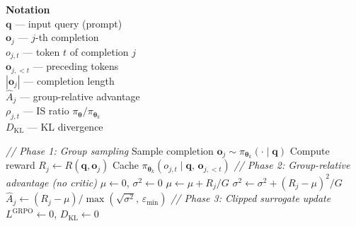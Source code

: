 \documentclass[11pt]{article}
\begin{document}
\begin{algorithm}[p]
\begin{minipage}[t]{0.28\linewidth}
\vspace{6pt}
\textbf{Notation} \\[2pt]
$\mathbf{q}$ — input query (prompt) \\
$\mathbf{o}_j$ — $j$-th completion \\
$o_{j,t}$ — token $t$ of completion $j$ \\
$\mathbf{o}_{j,<t}$ — preceding tokens \\
$|\mathbf{o}_j|$ — completion length \\
$\hat{A}_j$ — group-relative advantage \\
$\rho_{j,t}$ — IS ratio $\pi_{\boldsymbol{\theta}} / \pi_{\boldsymbol{\theta}_k}$ \\
$D_{\text{KL}}$ — KL divergence
\end{minipage}%
\hfill
\vrule
\hfill
\begin{minipage}[t]{0.68\linewidth}
\begin{algorithmic}[1]
    \Statex \hspace{\algorithmicindent}\textit{// Phase 1: Group sampling}
            \State Sample completion $\mathbf{o}_j \sim \pi_{\boldsymbol{\theta}_k}(\cdot \mid \mathbf{q})$
            \State Compute reward $R_j \gets R(\mathbf{q}, \mathbf{o}_j)$
                \State Cache $\pi_{\boldsymbol{\theta}_k}(o_{j,t} \mid \mathbf{q},\, \mathbf{o}_{j,<t})$
            \EndFor
        \EndFor
    \EndFor
    \Statex \hspace{\algorithmicindent}\textit{// Phase 2: Group-relative advantage (no critic)}
        \State $\mu \gets 0$, \; $\sigma^2 \gets 0$
            \State $\mu \gets \mu + R_j / G$
        \EndFor
            \State $\sigma^2 \gets \sigma^2 + (R_j - \mu)^2 / G$
        \EndFor
            \State $\hat{A}_j \gets (R_j - \mu) / \max(\sqrt{\sigma^2},\, \varepsilon_{\min})$
        \EndFor
    \EndFor
    \Statex \hspace{\algorithmicindent}\textit{// Phase 3: Clipped surrogate update}
            \State $L^{\text{GRPO}} \gets 0$, \; $D_{\text{KL}} \gets 0$

\end{algorithmic}
\end{minipage}
\end{algorithm}
\end{document}
